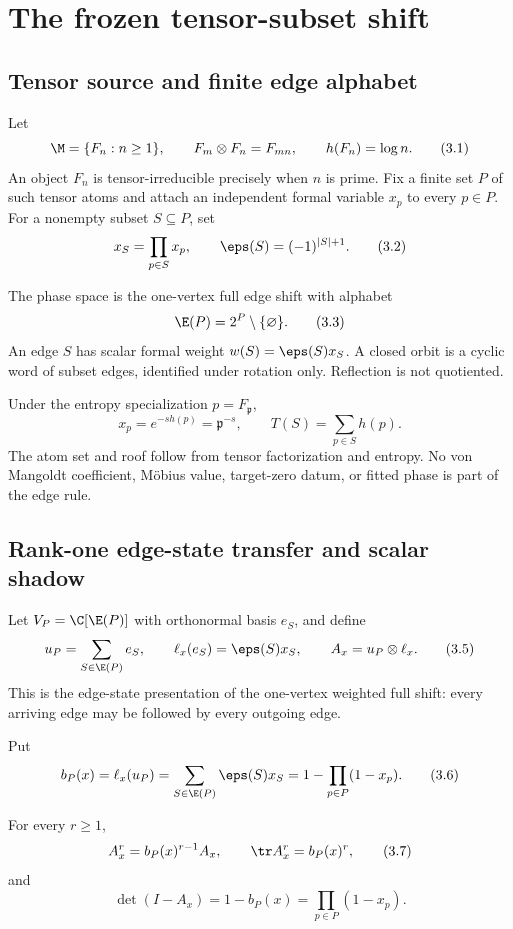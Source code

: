 \section{The frozen tensor-subset shift}
\label{sec:frozen}

\subsection{Tensor source and finite edge alphabet}

Let
\[
  \M=\{F_n:n\ge1\},\qquad F_m\otimes F_n=F_{mn},
  \qquad h(F_n)=\log n.
  \tag{3.1}
\]
An object $F_n$ is tensor-irreducible precisely when $n$ is prime.  Fix a
finite set $P$ of such tensor atoms and attach an independent formal variable
$x_p$ to every $p\in P$.  For a nonempty subset $S\subseteq P$, set
\[
  x_S=\prod_{p\in S}x_p,
  \qquad \eps(S)=(-1)^{|S|+1}.
  \tag{3.2}
\]

\begin{definition}
\label{def:shift}
The phase space is the one-vertex full edge shift with alphabet
\[
  \E(P)=2^P\setminus\{\varnothing\}.
  \tag{3.3}
\]
An edge $S$ has scalar formal weight $w(S)=\eps(S)x_S$.  A closed orbit is a
cyclic word of subset edges, identified under rotation only.  Reflection is
not quotiented.
\end{definition}

Under the entropy specialization $p=F_\mathfrak p$,
\[
  x_p=e^{-sh(p)}=\mathfrak p^{-s},
  \qquad
  T(S)=\sum_{p\in S}h(p).
  \tag{3.4}
\]
The atom set and roof follow from tensor factorization and entropy.  No
von Mangoldt coefficient, Möbius value, target-zero datum, or fitted phase is
part of the edge rule.

\subsection{Rank-one edge-state transfer and scalar shadow}

Let $V_P=\C[\E(P)]$ with orthonormal basis $e_S$, and define
\[
  u_P=\sum_{S\in\E(P)}e_S,
  \qquad
  \ell_x(e_S)=\eps(S)x_S,
  \qquad
  A_x=u_P\otimes\ell_x.
  \tag{3.5}
\]
This is the edge-state presentation of the one-vertex weighted full shift:
every arriving edge may be followed by every outgoing edge.

Put
\[
  b_P(x)=\ell_x(u_P)
  =\sum_{S\in\E(P)}\eps(S)x_S
  =1-\prod_{p\in P}(1-x_p).
  \tag{3.6}
\]

\begin{theorem}
\label{thm:rank-one}
For every $r\ge1$,
\[
  A_x^r=b_P(x)^{r-1}A_x,
  \qquad \tr A_x^r=b_P(x)^r,
  \tag{3.7}
\]
and
\[
  \det(I-A_x)=1-b_P(x)=\prod_{p\in P}(1-x_p).
  \tag{3.8}
\]
\end{theorem}

